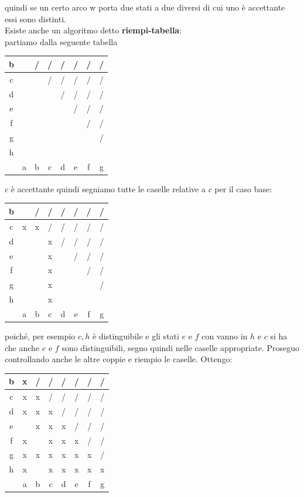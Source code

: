 quindi se un certo arco w porta due stati a due diversi di cui uno è accettante essi sono distinti.\\
Esiste anche un algoritmo detto \textbf{riempi-tabella}:\\
partiamo dalla seguente tabella
\begin{center}
	\begin{tabular}{c|c|c|c|c|c|c|c|}
		\hline
		b &   & / & / & / & / & / & / \\
		\hline
		c &   &   & / & / & / & / & / \\
		\hline
		d &   &   &   & / & / & / & / \\
		\hline
		e &   &   &   &   & / & / & / \\
		\hline
		f &   &   &   &   &   & / & / \\
		\hline
		g &   &   &   &   &   &   & / \\
		\hline
		h &   &   &   &   &   &   &   \\
		\hline
		  & a & b & c & d & e & f & g \\
		\hline
	\end{tabular}
\end{center}
$c$ è accettante quindi segniamo tutte le caselle relative a $c$ per il caso base:
\begin{center}
	\begin{tabular}{c|c|c|c|c|c|c|c|}
		\hline
		b &   & / & / & / & / & / & / \\
		\hline
		c & x & x & / & / & / & / & / \\
		\hline
		d &   &   & x & / & / & / & / \\
		\hline
		e &   &   & x &   & / & / & / \\
		\hline
		f &   &   & x &   &   & / & / \\
		\hline
		g &   &   & x &   &   &   & / \\
		\hline
		h &   &   & x &   &   &   &   \\
		\hline
		  & a & b & c & d & e & f & g \\
		\hline
	\end{tabular}
\end{center}
poiché, per esempio $c,h$ è distinguibile e gli stati $e$ e $f$ con \zero{} vanno in $h$ e $c$ si ha che anche $e$ e $f$ sono distinguibili, segno quindi nelle caselle appropriate. Proseguo controllando anche le altre coppie e riempio le caselle. Ottengo:
\begin{center}
	\begin{tabular}{c|c|c|c|c|c|c|c|}
		\hline
		b & x & / & / & / & / & / & / \\
		\hline
		c & x & x & / & / & / & / & / \\
		\hline
		d & x & x & x & / & / & / & / \\
		\hline
		e &   & x & x & x & / & / & / \\
		\hline
		f & x &   & x & x & x & / & / \\
		\hline
		g & x & x & x & x & x & x & / \\
		\hline
		h & x &   & x & x & x & x & x \\
		\hline
		  & a & b & c & d & e & f & g \\
		\hline
	\end{tabular}
\end{center}
